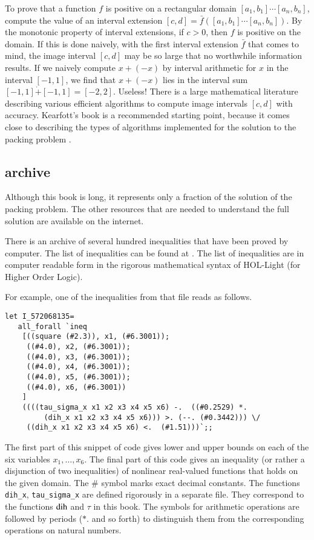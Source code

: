 To prove that a function $f$ is positive on a rectangular domain
$[a_1,b_1]\cdots[a_n,b_n]$, compute the
value of an interval extension $[c,d]=\bar f([a_1,b_1]\cdots[a_n,b_n])$.
By the monotonic property of interval extensions, if $c>0$, then $f$
is positive on the domain.  If this is done naively, with the
first interval extension $\bar f$ that comes to mind, the image interval
$[c,d]$ may be so large that no worthwhile information results.
If we naively 
compute $x+(-x)$ by interval arithmetic for $x$ in the interval $[-1,1]$,
we find that $x+(-x)$ lies in the interval sum
$[-1,1]\dot + [-1,1] = [-2,2]$.  Useless!
There is a large mathematical literature describing various 
efficient algorithms
to compute image intervals $[c,d]$ with accuracy.
Kearfott's book is a recommended starting point, because it comes
close to describing the types of algorithms implemented for the
solution to the packing problem \cite{Kea96}. 



\subsection{archive}

Although this book is long,  it represents only a fraction of the solution of
the packing problem.  The other resources that are needed to understand
the full solution are available on the internet.

There is an archive of  several hundred
inequalities that have been proved by computer.  The list of inequalities can
be found at \cite{web}.    
The list of inequalities are in computer readable
form in the rigorous mathematical syntax of HOL-Light (for Higher Order Logic).

For example, one of the inequalities from that file reads as follows.
\begin{verbatim}
let I_572068135=
   all_forall `ineq 
    [((square (#2.3)), x1, (#6.3001));
     ((#4.0), x2, (#6.3001));
     ((#4.0), x3, (#6.3001));
     ((#4.0), x4, (#6.3001));
     ((#4.0), x5, (#6.3001));
     ((#4.0), x6, (#6.3001))
    ]
    ((((tau_sigma_x x1 x2 x3 x4 x5 x6) -.  ((#0.2529) *.  
         (dih_x x1 x2 x3 x4 x5 x6))) >. (--. (#0.3442))) \/ 
     ((dih_x x1 x2 x3 x4 x5 x6) <.  (#1.51)))`;;
\end{verbatim}
The first part of this snippet of code gives lower and upper bounds on each of the six variables $x_1,\ldots,x_6$.  The final part of this code gives an inequality (or rather a disjunction of two inequalities) of nonlinear real-valued functions that holds on the given domain.
The $\#$ symbol marks exact decimal constants.  The functions {\tt dih\_x}, {\tt tau\_sigma\_x} are defined rigorously in a separate file.  They correspond to the functions 
$\operatorname{dih}$ and $\tau$ in this book.  The symbols for arithmetic operations are followed by periods ($*.$ and so forth) to distinguish them from the corresponding operations on natural numbers.  

